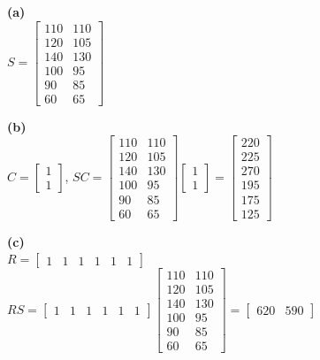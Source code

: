 \begin{solution}
\textbf{(a)} \\
$S = \begin{bmatrix} 110 & 110 \\ 120 & 105 \\ 140 & 130 \\ 100 & 95 \\ 90 & 85 \\ 60 & 65 \end{bmatrix}$

\medskip
\textbf{(b)} \\
$C = \begin{bmatrix} 1 \\ 1 \end{bmatrix}$, \quad
$SC = \begin{bmatrix} 110 & 110 \\ 120 & 105 \\ 140 & 130 \\ 100 & 95 \\ 90 & 85 \\ 60 & 65 \end{bmatrix} \begin{bmatrix} 1 \\ 1 \end{bmatrix} = \begin{bmatrix} 220 \\ 225 \\ 270 \\ 195 \\ 175 \\ 125 \end{bmatrix}$

\medskip
\textbf{(c)} \\
$R = \begin{bmatrix} 1 & 1 & 1 & 1 & 1 & 1 \end{bmatrix}$ \\
$RS = \begin{bmatrix} 1 & 1 & 1 & 1 & 1 & 1 \end{bmatrix} \begin{bmatrix} 110 & 110 \\ 120 & 105 \\ 140 & 130 \\ 100 & 95 \\ 90 & 85 \\ 60 & 65 \end{bmatrix} = \begin{bmatrix} 620 & 590 \end{bmatrix}$


\end{solution}
